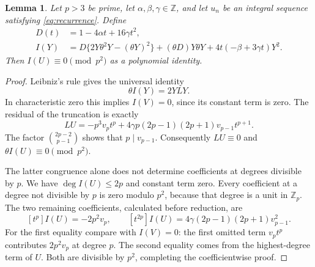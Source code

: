 \documentclass[11pt,a4paper]{article}
\newtheorem{lemma}[theorem]{Lemma}
\theoremstyle{remark}
\newcommand{\Z}{\mathbb Z}
\newcommand{\Zp}{\mathbb Z_p}
\begin{document}
\begin{lemma}\label{lem:invariant}
Let $p>3$ be prime, let $\alpha,\beta,\gamma\in\Z$, and let $u_n$
be an integral sequence satisfying \eqref{eq:recurrence}. Define
\begin{equation}\label{eq:invariant}
\begin{split}
 D(t)&=1-4\alpha t+16\gamma t^2,\\
 I(Y)&=D\{2Y\theta^2Y-(\theta Y)^2\}
      +(\theta D)Y\theta Y+4t(-\beta+3\gamma t)Y^2.
\end{split}
\end{equation}
Then $I(U)\equiv0\pmod{p^2}$ as a polynomial identity.
\end{lemma}
\begin{proof}
Leibniz's rule gives the universal identity
\begin{equation}\label{eq:invariant-derivative}
 \theta I(Y)=2YLY.
\end{equation}
In characteristic zero this implies $I(V)=0$, since its constant term
is zero. The residual of the truncation is exactly
\begin{equation}\label{eq:truncation-residual}
 LU=-p^3v_pt^p+4\gamma p(2p-1)(2p+1)v_{p-1}t^{p+1}.
\end{equation}
The factor $\binom{2p-2}{p-1}$ shows that $p\mid v_{p-1}$.
Consequently $LU\equiv0$ and $\theta I(U)\equiv0\pmod{p^2}$.

The latter congruence alone does not determine coefficients at degrees
divisible by $p$. We have $\deg I(U)\le2p$ and constant term zero.
Every coefficient at a degree not divisible by $p$ is zero modulo
$p^2$, because that degree is a unit in $\Zp$. The two remaining
coefficients, calculated before reduction, are
\begin{equation}\label{eq:resonant}
 [t^p]I(U)=-2p^2v_p,\qquad
 [t^{2p}]I(U)=4\gamma(2p-1)(2p+1)v_{p-1}^2.
\end{equation}
For the first equality compare with $I(V)=0$: the first omitted term
$v_pt^p$ contributes $2p^2v_p$ at degree $p$. The second equality
comes from the highest-degree term of $U$. Both are divisible by
$p^2$, completing the coefficientwise proof.
\end{proof}
\end{document}

